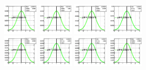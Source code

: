 \begin{spacing}{2}
\begin{figure}[!htbp]
{{\includegraphics[width=0.16\textwidth]{fig/posteriors__pdf42_BB18_fitBBBE161718_ADDGRW.png}
\includegraphics[width=0.16\textwidth]{fig/posteriors__pdf43_BB18_fitBBBE161718_ADDGRW.png}
\includegraphics[width=0.16\textwidth]{fig/posteriors__pdf44_BB18_fitBBBE161718_ADDGRW.png}
\includegraphics[width=0.16\textwidth]{fig/posteriors__pdf45_BB18_fitBBBE161718_ADDGRW.png}\\
\includegraphics[width=0.16\textwidth]{fig/posteriors__pdf46_BB18_fitBBBE161718_ADDGRW.png}
\includegraphics[width=0.16\textwidth]{fig/posteriors__pdf47_BB18_fitBBBE161718_ADDGRW.png}
\includegraphics[width=0.16\textwidth]{fig/posteriors__pdf48_BB18_fitBBBE161718_ADDGRW.png}
\includegraphics[width=0.16\textwidth]{fig/posteriors__pdf49_BB18_fitBBBE161718_ADDGRW.png}
}}
\end{figure}
\end{spacing}

